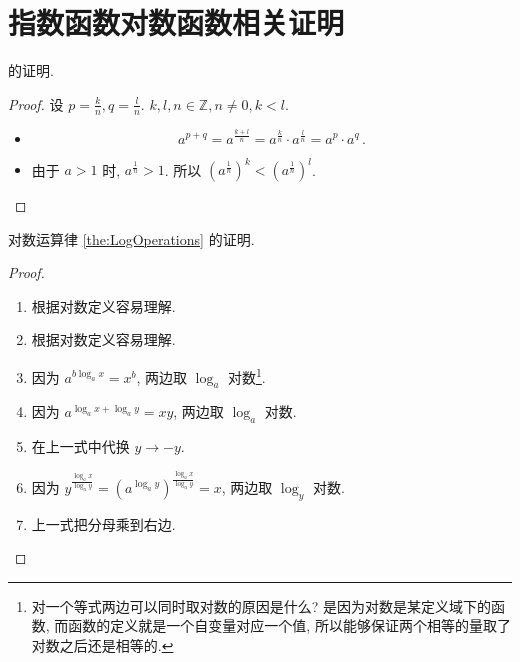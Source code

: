 \documentclass{book}
\newcommand{\Z}{\mathbb{Z}}
\numberwithin{equation}{section}
\numberwithin{figure}{section}
\theoremstyle{definition}
\begin{document}
\section{指数函数对数函数相关证明}
 的\hypertarget{proof:ExponentQTheorem}{证明}.
\begin{proof}
  \leavevmode

  设 $p=\frac{k}{n},q=\frac{l}{n}$. $k,l,n\in\Z,n\neq0,k<l$.
  \begin{itemize}
    \item 
      \begin{equation*}
	a^{p+q}=a^{\frac{k+l}{n}}=a^{\frac{k}{n}}\cdot a^{\frac{l}{n}}=a^p \cdot a^q\,.
      \end{equation*}
    \item 由于 $a>1$ 时, $a^{\frac{1}{n}}>1$. 所以 $\left( a^{\frac{1}{n}} \right)^k<\left( a^{\frac{1}{n}} \right)^l$.
  \end{itemize}
\end{proof}

对数运算律 \cref{the:LogOperations} 的\hypertarget{proof:LogOperations}{证明}.
\begin{proof}
  \leavevmode

  \begin{enumerate}
    \item 根据对数定义容易理解.
    \item 根据对数定义容易理解.
    \item 因为 $a^{b\log_a x}=x^b$, 两边取 $\log_a$ 对数\footnote{对一个等式两边可以同时取对数的原因是什么? 是因为对数是某定义域下的函数, 而函数的定义就是一个自变量对应一个值, 所以能够保证两个相等的量取了对数之后还是相等的.}.
    \item 因为 $a^{\log_a x+\log_a y}=xy$, 两边取 $\log_a$ 对数.
    \item 在上一式中代换 $y\to-y$.
    \item 因为 $y^{\frac{\log_a x}{\log_a y}}=\left( a^{\log_a y} \right)^{\frac{\log_a x}{\log_a y}}=x$, 两边取 $\log_y$ 对数.
    \item 上一式把分母乘到右边.
  \end{enumerate}
\end{proof}
\end{document}

